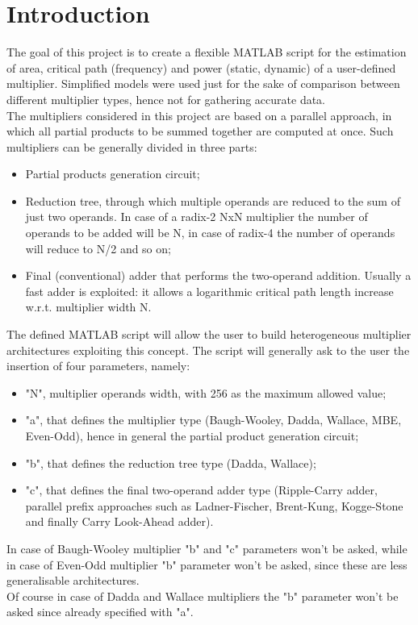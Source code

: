 \documentclass[11pt]{article} %
\begin{document}
\section{Introduction}
The goal of this project is to create a flexible MATLAB script for the estimation of area, critical path (frequency) and power (static, dynamic) of a user-defined multiplier. 
Simplified models were used just for the sake of comparison between different multiplier types, hence not for gathering accurate data.\\
The multipliers considered in this project are based on a parallel approach, in which all partial products to be summed together are computed at once. Such multipliers can be generally divided in three parts:
\begin{itemize}
\item Partial products generation circuit;
\item Reduction tree, through which multiple operands are reduced to the sum of just two operands. In case of a radix-2 NxN multiplier the number of operands to be added will be N, in case of radix-4 the number of operands will reduce to N/2 and so on;
\item Final (conventional) adder that performs the two-operand addition. Usually a fast adder is exploited: it allows a logarithmic critical path length increase w.r.t. multiplier width N.
\end{itemize}
The defined MATLAB script will allow the user to build heterogeneous multiplier architectures exploiting this concept.
The script will generally ask to the user the insertion of four parameters, namely:
\begin{itemize}
    \item "N", multiplier operands width, with 256 as the maximum allowed value;
    \item "a", that defines the multiplier type (Baugh-Wooley, Dadda, Wallace, MBE, Even-Odd), hence in general the partial product generation circuit;
    \item "b", that defines the reduction tree type (Dadda, Wallace);
    \item "c", that defines the final two-operand adder type (Ripple-Carry adder, parallel prefix approaches such as Ladner-Fischer, Brent-Kung, Kogge-Stone and finally Carry Look-Ahead adder).
\end{itemize} 
In case of Baugh-Wooley multiplier "b" and "c" parameters won't be asked, while in case of Even-Odd multiplier "b" parameter won't be asked, since these are less generalisable architectures.\\
Of course in case of Dadda and Wallace multipliers the "b" parameter won't be asked since already specified with "a".
\newpage
\end{document}
